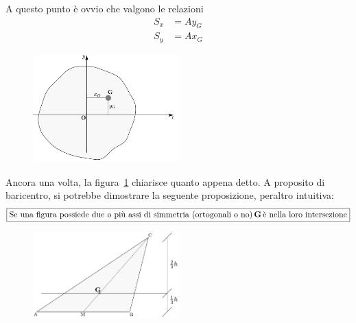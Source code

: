 \noindent A questo punto è ovvio che valgono le relazioni 
\begin{align} 
S_x    &= Ay_G \tag{1.4a} \label{equazione1-4a} \\
S_y    &= Ax_G \tag{1.4b} \label{equazione1-4b}
\end{align}
\renewcommand{\thefigure}{1~-~5}
\begin{figure}[h]
\centering
\includegraphics[width=0.5\textwidth]{Immagini/Parte_1/Figura1_5/Figura1_5.pdf}
\caption{}
\label{figura1-5}
\end{figure}

\noindent Ancora una volta, la figura~\ref{figura1-5} chiarisce quanto appena detto. A proposito di baricentro, si potrebbe dimostrare la seguente proposizione, peraltro intuitiva:
\begin{equation*} 
\boxed{\textup{Se una figura possiede due o più assi di simmetria (ortogonali o no)}\,\mathbf{G}\,\textup{è nella loro intersezione}}
\end{equation*}
\renewcommand{\thefigure}{1~-~6}
\begin{figure}[h]
\centering
\includegraphics[width=0.5\textwidth]{Immagini/Parte_1/Figura1_6/Figura1_6.pdf}
\caption{}
\label{figura1-6}
\end{figure}

